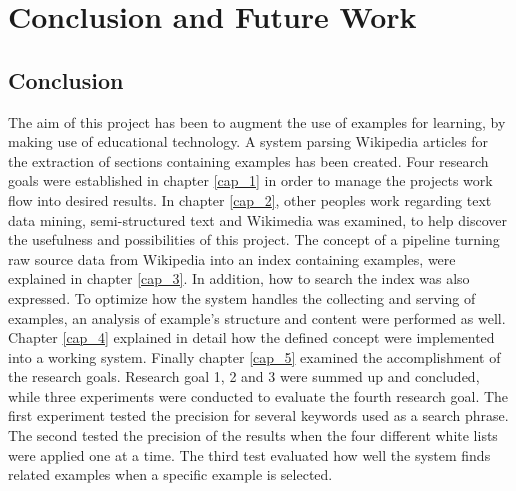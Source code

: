 
\chapter{Conclusion and Future Work}


\section{Conclusion}

The aim of this project has been to augment the use of examples for learning, by making use of educational technology. A system parsing Wikipedia articles for the extraction of sections containing examples has been created. Four research goals were established in chapter \ref{cap_1} in order to manage the projects work flow into desired results. In chapter \ref{cap_2}, other peoples work regarding text data mining, semi-structured text and Wikimedia was examined, to help discover the usefulness and possibilities of this project. The concept of a pipeline turning raw source data from Wikipedia into an index containing examples, were explained in chapter \ref{cap_3}. In addition, how to search the index was also expressed. To optimize how the system handles the collecting and serving of examples, an analysis of example's structure and content were performed as well. Chapter \ref{cap_4} explained in detail how the defined concept were implemented into a working system. Finally chapter \ref{cap_5} examined the accomplishment of the research goals. Research goal 1, 2 and 3 were summed up and concluded, while three experiments were conducted to evaluate the fourth research goal. The first experiment tested the precision for several keywords used as a search phrase. The second tested the precision of the results when the four different white lists were applied one at a time. The third test evaluated how well the system finds related examples when a specific example is selected.

